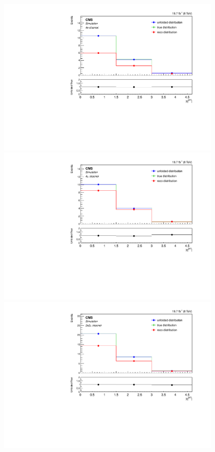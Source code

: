 \begin{figure}[hbtp]
\begin{center}
    \includegraphics[width=0.8\cmsFigWidth]{Figures/Unfolding/MCTests/EtaJet1_ZZTo4e_MadMatrix_MadDistr_HalfSample_fr}     
    \includegraphics[width=0.8\cmsFigWidth]{Figures/Unfolding/MCTests/EtaJet1_ZZTo4m_MadMatrix_MadDistr_HalfSample_fr}     
    \includegraphics[width=0.8\cmsFigWidth]{Figures/Unfolding/MCTests/EtaJet1_ZZTo2e2m_MadMatrix_MadDistr_HalfSample_fr}     

\end{center}
\end{figure}
